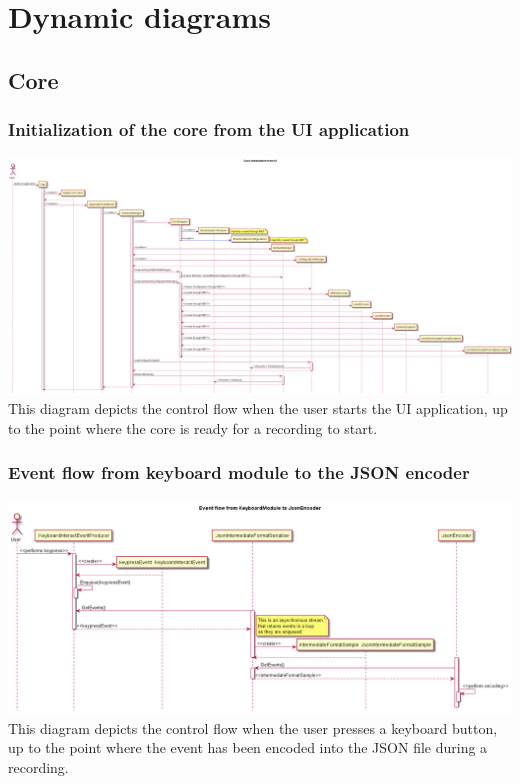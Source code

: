 \chapter{Dynamic diagrams}
\label{ch:dynamicdiagram}

\section{Core}
\subsection{Initialization of the core from the UI application}
\includegraphics[width=1.1\textwidth]{resources/DynamicDiagrams/InitCore.png}
This diagram depicts the control flow when the user starts the UI application, up to the point where the core is ready for a recording to start.

\subsection{Event flow from keyboard module to the JSON encoder}
\includegraphics[width=1.1\textwidth]{resources/DynamicDiagrams/EventFlowKeyboardToEncoder.png}
This diagram depicts the control flow when the user presses a keyboard button, up to the point where the event has been encoded into the JSON file during a recording.

